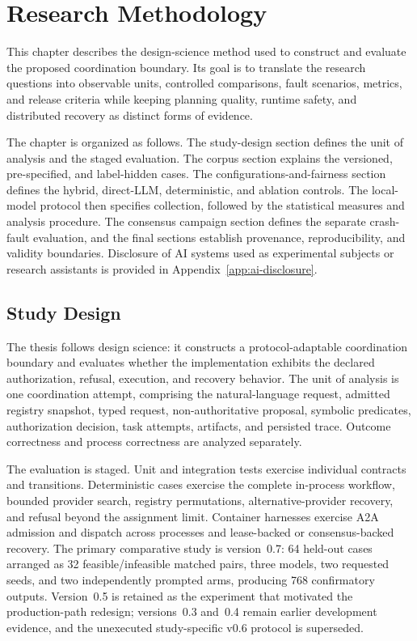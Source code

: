 \chapter{Research Methodology}
\label{chap:methodology}

This chapter describes the design-science method used to construct and evaluate the proposed coordination boundary. Its goal is to translate the research questions into observable units, controlled comparisons, fault scenarios, metrics, and release criteria while keeping planning quality, runtime safety, and distributed recovery as distinct forms of evidence.

The chapter is organized as follows. The study-design section defines the unit of analysis and the staged evaluation. The corpus section explains the versioned, pre-specified, and label-hidden cases. The configurations-and-fairness section defines the hybrid, direct-LLM, deterministic, and ablation controls. The local-model protocol then specifies collection, followed by the statistical measures and analysis procedure. The consensus campaign section defines the separate crash-fault evaluation, and the final sections establish provenance, reproducibility, and validity boundaries. Disclosure of AI systems used as experimental subjects or research assistants is provided in Appendix~\ref{app:ai-disclosure}.

\section{Study Design}

The thesis follows design science: it constructs a protocol-adaptable coordination boundary and evaluates whether the implementation exhibits the declared authorization, refusal, execution, and recovery behavior. The unit of analysis is one coordination attempt, comprising the natural-language request, admitted registry snapshot, typed request, non-authoritative proposal, symbolic predicates, authorization decision, task attempts, artifacts, and persisted trace. Outcome correctness and process correctness are analyzed separately.

The evaluation is staged. Unit and integration tests exercise individual contracts and transitions. Deterministic cases exercise the complete in-process workflow, bounded provider search, registry permutations, alternative-provider recovery, and refusal beyond the assignment limit. Container harnesses exercise A2A admission and dispatch across processes and lease-backed or consensus-backed recovery. The primary comparative study is version~0.7: 64 held-out cases arranged as 32 feasible/infeasible matched pairs, three models, two requested seeds, and two independently prompted arms, producing 768 confirmatory outputs. Version~0.5 is retained as the experiment that motivated the production-path redesign; versions~0.3 and~0.4 remain earlier development evidence, and the unexecuted study-specific v0.6 protocol is superseded.

